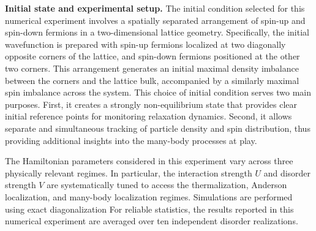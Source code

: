 \textbf{Initial state and experimental setup.}
The initial condition selected for this numerical experiment involves a spatially separated arrangement of spin-up and spin-down fermions in a two-dimensional lattice geometry. Specifically, the initial wavefunction is prepared with spin-up fermions localized at two diagonally opposite corners of the lattice, and spin-down fermions positioned at the other two corners. This arrangement generates an initial maximal density imbalance between the corners and the lattice bulk, accompanied by a similarly maximal spin imbalance across the system. This choice of initial condition serves two main purposes. First, it creates a strongly non-equilibrium state that provides clear initial reference points for monitoring relaxation dynamics. Second, it allows separate and simultaneous tracking of particle density and spin distribution, thus providing additional insights into the many-body processes at play.

The Hamiltonian parameters considered in this experiment vary across three physically relevant regimes. In particular, the interaction strength $U$ and disorder strength $V$ are systematically tuned to access the thermalization, Anderson localization, and many-body localization regimes. Simulations are performed using exact diagonalization 
For reliable statistics, the results reported in this numerical experiment are averaged over ten independent disorder realizations.




